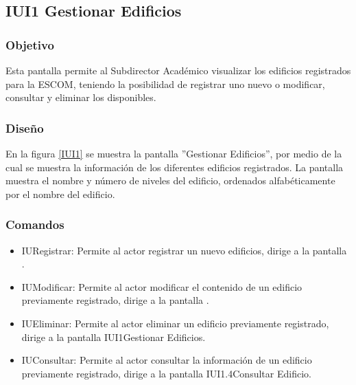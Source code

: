 \subsection{IUI1 Gestionar Edificios}

\subsubsection{Objetivo}
	
	Esta pantalla permite al Subdirector Académico visualizar los edificios registrados para la ESCOM, teniendo la posibilidad de registrar uno nuevo o modificar, consultar y eliminar los disponibles.

\subsubsection{Diseño}

    En la figura \ref{IUI1} se muestra la pantalla ''Gestionar Edificios'', por medio de la cual se muestra la información de los diferentes edificios registrados. La pantalla muestra el nombre y número de niveles del edificio, ordenados alfabéticamente por el nombre del edificio.
 

\subsubsection{Comandos}
    \begin{itemize}
	\item IURegistrar: Permite al actor registrar un nuevo edificios, dirige a la pantalla .
	
	\item IUModificar: Permite al actor modificar el contenido de un edificio previamente registrado, dirige a la pantalla .
	
	\item IUEliminar: Permite al actor eliminar un edificio previamente registrado, dirige a la pantalla {IUI1}{Gestionar Edificios}.
	
	\item IUConsultar: Permite al actor consultar la información de un edificio previamente registrado, dirige a la pantalla {IUI1.4}{Consultar Edificio}.
    \end{itemize}

